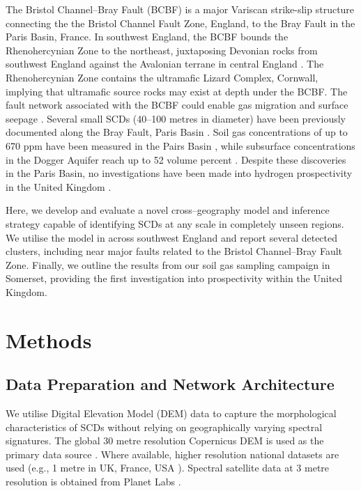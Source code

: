 \documentclass[12pt]{article}
\begin{document}
The Bristol Channel--Bray Fault (BCBF) is a major Variscan strike-slip structure connecting the the Bristol Channel Fault Zone, England, to the Bray Fault in the Paris Basin, France. In southwest England, the BCBF bounds the Rhenohercynian Zone to the northeast, juxtaposing Devonian rocks from southwest England against the Avalonian terrane in central England \cite{Suture}. The Rhenohercynian Zone contains the ultramafic Lizard Complex, Cornwall, implying that ultramafic  source rocks may exist at depth under the BCBF. The fault network associated with the BCBF could enable gas migration and surface seepage \cite{BristolChannel_SMargin}. Several small SCDs (40--100 metres in diameter) have been previously documented along the Bray Fault, Paris Basin \cite{roche}. Soil gas  concentrations of up to 670 ppm have been measured in the Pairs Basin \cite{Leger}, while subsurface  concentrations in the Dogger Aquifer reach up to 52 volume percent \cite{paris}. Despite these discoveries in the Paris Basin, no investigations have been made into hydrogen prospectivity in the United Kingdom \cite{nerc539907}.

Here, we develop and evaluate a novel cross--geography model and inference strategy capable of identifying SCDs at any scale in completely unseen regions. We utilise the model in across southwest England and report several detected clusters, including near major faults related to the Bristol Channel--Bray Fault Zone. Finally, we outline the results from our soil gas sampling campaign in Somerset, providing the first investigation into  prospectivity within the United Kingdom.

\section{Methods}

\subsection{Data Preparation and Network Architecture}

We utilise Digital Elevation Model (DEM) data to capture the morphological characteristics of SCDs without relying on geographically varying spectral signatures. The global 30 metre resolution Copernicus DEM is used as the primary data source \cite{CopernicusDEM2022}. Where available, higher resolution national datasets are used (e.g., 1 metre in UK, France, USA \cite{defra2026, ign2021rgealti, usgs3dep1mdem}). Spectral satellite data at 3 metre resolution is obtained from Planet Labs \cite{Planet}.
\end{document}
